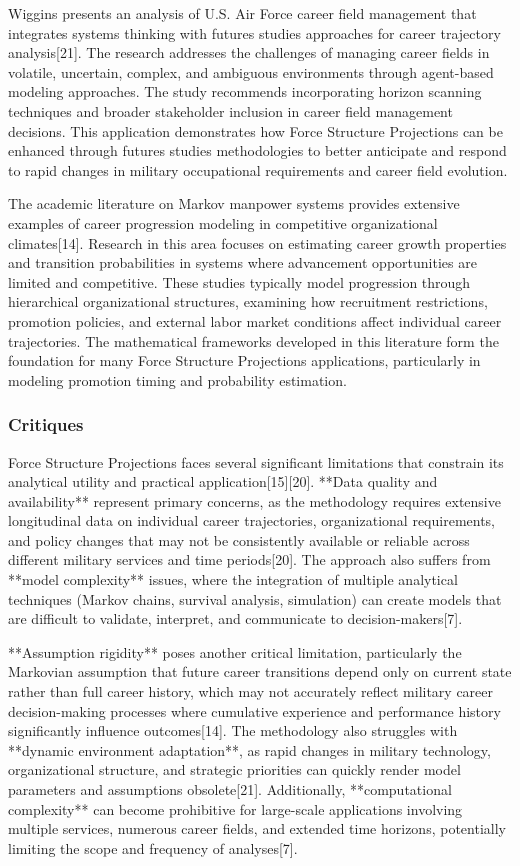 \documentclass[main.tex]{subfiles}
\begin{document}
Wiggins presents an analysis of U.S. Air Force career field management that integrates systems thinking with futures studies approaches for career trajectory analysis[21]. The research addresses the challenges of managing career fields in volatile, uncertain, complex, and ambiguous environments through agent-based modeling approaches. The study recommends incorporating horizon scanning techniques and broader stakeholder inclusion in career field management decisions. This application demonstrates how Force Structure Projections can be enhanced through futures studies methodologies to better anticipate and respond to rapid changes in military occupational requirements and career field evolution.

The academic literature on Markov manpower systems provides extensive examples of career progression modeling in competitive organizational climates[14]. Research in this area focuses on estimating career growth properties and transition probabilities in systems where advancement opportunities are limited and competitive. These studies typically model progression through hierarchical organizational structures, examining how recruitment restrictions, promotion policies, and external labor market conditions affect individual career trajectories. The mathematical frameworks developed in this literature form the foundation for many Force Structure Projections applications, particularly in modeling promotion timing and probability estimation.

\subsubsection{Critiques}

Force Structure Projections faces several significant limitations that constrain its analytical utility and practical application[15][20]. **Data quality and availability** represent primary concerns, as the methodology requires extensive longitudinal data on individual career trajectories, organizational requirements, and policy changes that may not be consistently available or reliable across different military services and time periods[20]. The approach also suffers from **model complexity** issues, where the integration of multiple analytical techniques (Markov chains, survival analysis, simulation) can create models that are difficult to validate, interpret, and communicate to decision-makers[7].

**Assumption rigidity** poses another critical limitation, particularly the Markovian assumption that future career transitions depend only on current state rather than full career history, which may not accurately reflect military career decision-making processes where cumulative experience and performance history significantly influence outcomes[14]. The methodology also struggles with **dynamic environment adaptation**, as rapid changes in military technology, organizational structure, and strategic priorities can quickly render model parameters and assumptions obsolete[21]. Additionally, **computational complexity** can become prohibitive for large-scale applications involving multiple services, numerous career fields, and extended time horizons, potentially limiting the scope and frequency of analyses[7].
\end{document}
